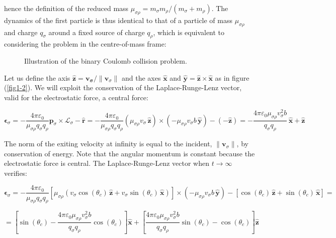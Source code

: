 hence the definition of the reduced mass $\mu_{\sigma\rho}=m_\sigma m_\rho/\left(m_\sigma+m_\rho\right)$. The dynamics of the first particle is thus identical to that of a particle of mass $\mu_{\sigma\rho}$ and charge $q_\sigma$ around a fixed source of charge $q_\rho$, which is equivalent to considering the problem in the centre-of-mass frame:

\begin{figure}[H]
    \centering
    
    \caption{Illustration of the binary Coulomb collision problem.}
    \label{fig1-3}
\end{figure}

Let us define the axis $\mathbf{\hat{z}}=\mathbf{v_\sigma}/\|\mathbf{v}_\sigma\|$ and the axes $\mathbf{\hat{x}}$ and $\mathbf{\hat{y}}=\mathbf{\hat{z}}\times\mathbf{\hat{x}}$ as in figure (\ref{fig1-2}). We will exploit the conservation of the Laplace-Runge-Lenz vector, valid for the electrostatic force, a central force:

\begin{equation}
    \label{eq-1-29}
    \boldsymbol{\epsilon}_\sigma=-\frac{4\pi\varepsilon_0}{\mu_{\sigma\rho}q_\sigma q_\rho}\mathbf{p}_\sigma\times\mathbf{\mathcal{L}}_\sigma-\mathbf{\hat{r}}=
    -\frac{4\pi\varepsilon_0}{\mu_{\sigma\rho}q_\sigma q_\rho}\left(\mu_{\sigma\rho}v_\sigma\,\mathbf{\hat{z}}\right)\times\left(-\mu_{\sigma\rho}v_\sigma b\,\mathbf{\hat{y}}\right)-\left(-\mathbf{\hat{z}}\right)=-\frac{4\pi\varepsilon_0\mu_{\sigma\rho}v_\sigma^2b}{q_\sigma q_\rho}\,\mathbf{\hat{x}}+\mathbf{\hat{z}}
\end{equation}

The norm of the exiting velocity at infinity is equal to the incident, $\|\mathbf{v}_\sigma\|$, by conservation of energy. Note that the angular momentum is constant because the electrostatic force is central. The Laplace-Runge-Lenz vector when $t\to\infty$ verifies:

\begin{equation}
    \boldsymbol{\epsilon}_\sigma=-\frac{4\pi\varepsilon_0}{\mu_{\sigma\rho}q_\sigma q_\rho}\left[\mu_{\sigma\rho}\left(v_\sigma\cos(\theta_c)\,\mathbf{\hat{z}}+v_\sigma\sin(\theta_c)\,\mathbf{\hat{x}}\right)\right]\times\left(-\mu_{\sigma\rho}v_\sigma b\,\mathbf{\hat{y}}\right)-\left[\cos(\theta_c)\,\mathbf{\hat{z}}+\sin(\theta_c)\,\mathbf{\hat{x}}\right]=
\end{equation}

\begin{equation}
    \label{eq-1-31}
    =\left[\sin(\theta_c)-\frac{4\pi\varepsilon_0\mu_{\sigma\rho}v_\sigma^2b}{q_\sigma q_\rho}\cos(\theta_c)\right]\mathbf{\hat{x}}+\left[\frac{4\pi\varepsilon_0\mu_{\sigma\rho}v_\sigma^2b}{q_\sigma q_\rho}\sin(\theta_c)-\cos(\theta_c)\right]\mathbf{\hat{z}}
\end{equation}

